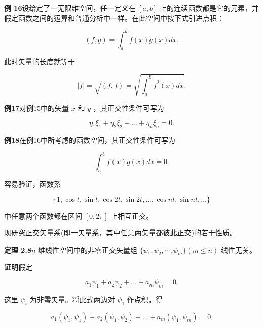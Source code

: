 \textbf{例 16}\quad 设给定了一无限维空间，任一定义在 $[a, b]$ 上的连续函数都是它的元素，并假定函数之间的运算和普通分析中一样。在此空间中按下式引进点积：

\begin{equation*}
(f, g) = \int_ {a} ^ {b} f (x) g (x) d x.\tag{2.68}
\end{equation*}

此时矢量的长度就等于

\begin{equation*}
| f | = \sqrt {(f , f)} = \sqrt {\int_ {a} ^ {b} f ^ {2} (x) d x}.
\end{equation*}

\textbf{例17}\quad 对例15中的矢量 $x$ 和 $y$ ，其正交性条件可写为

\begin{equation*}
\eta_ {1} \xi_ {1} + \eta_ {2} \xi_ {2} + \dots + \eta_ {n} \xi_ {n} = 0.
\end{equation*}

\textbf{例18}\quad 在例16中所考虑的函数空间，其正交性条件可写为

\begin{equation*}
\int_ {a} ^ {b} f (x) g (x) d x = 0.
\end{equation*}

容易验证，函数系

\begin{equation*}
\{1, \cos t, \sin t, \cos 2 t, \sin 2 t, \dots , \cos n t, \sin n t, \dots \}
\end{equation*}

中任意两个函数都在区间 $[0,2\pi]$ 上相互正交。

现研究正交矢量系(即一矢量系，其中任意两矢量都彼此正交)的若干性质。

\textbf{定理 2.8}\quad $n$ 维线性空间中的非零正交矢量组 $\{\psi_{1}, \psi_{2}, \cdots, \psi_{m}\} (m \leqslant n)$ 线性无关。

\textbf{证明}\quad 假定

\begin{equation*}
a _ {1} \psi_ {1} + a _ {2} \psi_ {2} + \dots + a _ {m} \psi_ {m} = 0.
\end{equation*}

这里 $\psi_{i}$ 为非零矢量。将此式两边对 $\psi_{1}$ 作点积，得

\begin{equation*}
a _ {1} \left(\psi_ {1}, \psi_ {1}\right) + a _ {2} \left(\psi_ {1}, \psi_ {2}\right) + \dots + a _ {m} \left(\psi_ {1}, \psi_ {m}\right) = 0.
\end{equation*}

